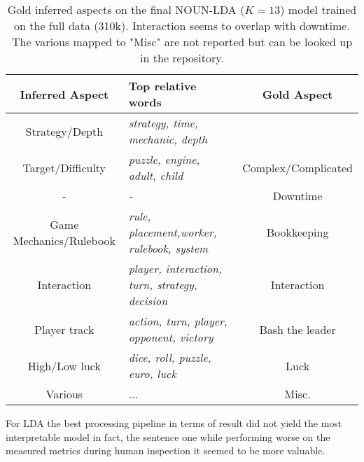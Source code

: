 \begin{center}

    \begin{table}
        \begin{tabular}{c l c}
            \hline
            Inferred Aspect         & Top relative words                                     & Gold Aspect \\ [0.5ex]
            \hline\hline
            Strategy/Depth          & \textit{strategy, time, mechanic, depth}               &                     \\
            Target/Difficulty       & \textit{puzzle, engine, adult, child}                  & Complex/Complicated \\
            \hline
            -                       & \textit{-}                                             & Downtime            \\
            \hline
            Game Mechanics/Rulebook & \textit{rule, placement,worker, rulebook, system}      & Bookkeeping         \\
            \hline
            Interaction             & \textit{player, interaction, turn, strategy, decision} & Interaction         \\
            \hline
            Player track            & \textit{action, turn, player, opponent, victory}       & Bash the leader     \\
            \hline
            High/Low luck           & \textit{dice, roll, puzzle, euro, luck}                & Luck                \\
            \hline
            Various                 & ...                                                    & Misc.               \\
            \hline
        \end{tabular}
        \caption{Gold inferred aspects on the final NOUN-LDA ($K=13$) model trained on the full data (310k).
        Interaction seems to overlap with downtime.
        The various mapped to "Misc" are not reported but can be looked up in the repository.
        }
        \label{nounlda}

    \end{table}

\end{center}

For LDA the best processing pipeline in terms of result did not yield the most interpretable model in fact,
the sentence one while performing worse on the measured metrics during human inspection it seemed to be more valuable.


